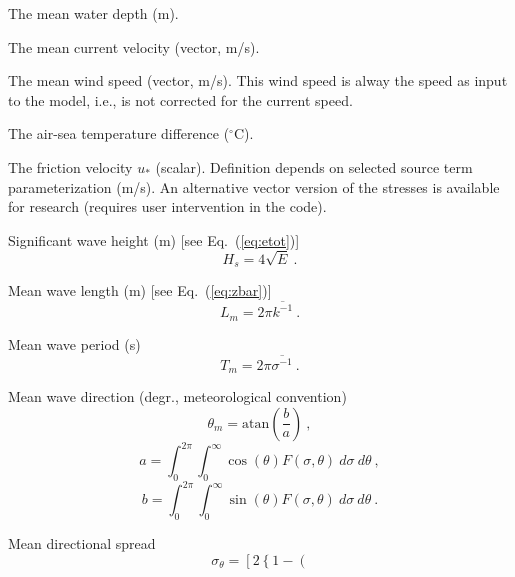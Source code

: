 \begin{list}{)\hfill}
            { \leftmargin 15mm 
             \rightmargin 5mm \itemsep 0mm \parsep 0mm}
\item The mean water depth (m).
\item The mean current velocity (vector, m/s).
\item The mean wind speed (vector, m/s). This wind speed is alway the
      speed as input to the model, i.e., is not corrected for the current
      speed.
\item The air-sea temperature difference ($^\circ$C).
\item The friction velocity $u_\ast$ (scalar). Definition depends on
      selected source term parameterization (m/s). An alternative vector version
      of the stresses is available for research (requires user intervention in
      the code).
\item Significant wave height (m) [see Eq.~(\ref{eq:etot})]
      \begin{equation} H_s = 4 \sqrt{E} \: . \label{eq:Hs} \end{equation}
\item Mean wave length (m) [see Eq.~(\ref{eq:zbar})]
      \begin{equation} L_m = 2\pi \overline{k^{-1}}
      \: . \label{eq:Lm} \end{equation}
\item Mean wave period (s)
      \begin{equation} T_m = 2\pi \overline{\sigma^{-1}}
      \: . \label{eq:Tm} \end{equation}
\item Mean wave direction (degr., meteorological convention)
      \begin{equation} \theta_m = \mbox{atan} \left ( \frac{b}{a} \right )
      \: , \label{eq:theta_m} \end{equation} \begin{equation}
      a = \int_0^{2\pi} \int_0^\infty \cos(\theta) F(\sigma,\theta) \:
      d\sigma \: d\theta \: , \end{equation} \begin{equation}
      b = \int_0^{2\pi} \int_0^\infty \sin(\theta) F(\sigma,\theta) \:
      d\sigma \: d\theta \: . \end{equation}
\item Mean directional spread \citep[degr.;][]{art:KVH88}
      \begin{equation} \sigma_\theta = \left [ 2 \left \{ 1 - \left (

\end{equation}
\end{list}
